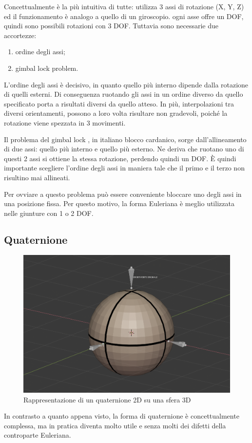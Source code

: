 Concettualmente è la più intuitiva di tutte: utilizza 3 assi di rotazione (X, Y, Z) ed il funzionamento è analogo a quello di un giroscopio. ogni asse offre un DOF, quindi sono possibili rotazioni con 3 DOF. Tuttavia sono necessarie due accortezze: 
\begin{enumerate}
    \item ordine degli assi;
    \item gimbal lock problem.
\end{enumerate}
L'ordine degli assi è decisivo, in quanto quello più interno dipende dalla rotazione di quelli esterni. Di conseguenza ruotando gli assi in un ordine diverso da quello specificato porta a risultati diversi da quello atteso. In più, interpolazioni tra diversi orientamenti, possono a loro volta risultare non gradevoli, poiché la rotazione viene spezzata in 3 movimenti.

Il problema del gimbal lock \parencite{anticz16}, in italiano blocco cardanico, sorge dall'allineamento di due assi: quello più interno e quello più esterno. Ne deriva che ruotano uno di questi 2 assi si ottiene la stessa rotazione, perdendo quindi un DOF.
È quindi importante scegliere l'ordine degli assi in maniera tale che il primo e il terzo non risultino mai allineati.

Per ovviare a questo problema può essere conveniente bloccare uno degli assi in una posizione fissa. Per questo motivo, la forma Euleriana è meglio utilizzata nelle giunture con 1 o 2 DOF.

\subsection{Quaternione}
\begin{figure}[ht]
\centering
\includegraphics[width=.8\textwidth]{Figures/3d-sphere}
\decoRule
\caption[Quaternione 2D]{Rappresentazione di un quaternione 2D su una sfera 3D}
\label{fig:quater}
\end{figure}
In contrasto a quanto appena visto, la forma di quaternione è concettualmente complessa, ma in pratica diventa molto utile e senza molti dei difetti della controparte Euleriana.

